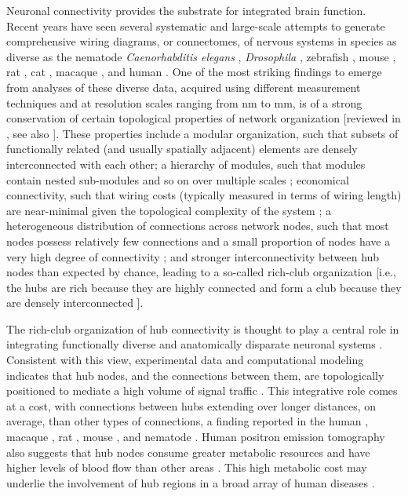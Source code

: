 Neuronal connectivity provides the substrate for integrated brain function.
Recent years have seen several systematic and large-scale attempts to generate comprehensive wiring diagrams, or connectomes, of nervous systems \citep{VandenHeuvel2016} in species as diverse as the nematode \emph{Caenorhabditis elegans} \citep{White1986, Varshney2011}, \emph{Drosophila} \citep{Chiang2011a, Shih2015}, zebrafish \citep{Wanner2016, Hildebrand2017}, mouse \citep{Oh2014, Zingg2014}, rat \citep{Bota2015}, cat \citep{Scannell1995}, macaque \citep{Markov2014, Stephan2001}, and human \citep{Hagmann2008, VanEssen2013}.
One of the most striking findings to emerge from analyses of these diverse data, acquired using different measurement techniques and at resolution scales ranging from nm to mm, is of a strong conservation of certain topological properties of network organization [reviewed in \citep{Bullmore2009, Bullmore2012, Sporns2011, VandenHeuvel2016b, Schroter2017}, see also \citep{Fornito2016}].
These properties include a modular organization, such that subsets of functionally related (and usually spatially adjacent) elements are densely interconnected with each other;
a hierarchy of modules, such that modules contain nested sub-modules and so on over multiple scales \citep{Meunier2010a, Bassett2010};
economical connectivity, such that wiring costs (typically measured in terms of wiring length) are near-minimal given the topological complexity of the system \citep{Betzel2016, Bassett2010};
a heterogeneous distribution of connections across network nodes, such that most nodes possess relatively few connections and a small proportion of nodes have a very high degree of connectivity \citep{VandenHeuvel2013b, Varshney2011};
and stronger interconnectivity between hub nodes than expected by chance, leading to a so-called rich-club organization [i.e., the hubs are rich because they are highly connected and form a club because they are densely interconnected \citep{VandenHeuvel2011,Zamora-Lopez2010,DeReus2013b,Towlson2013,Shih2015}].

The rich-club organization of hub connectivity is thought to play a central role in integrating functionally diverse and anatomically disparate neuronal systems \citep{Fornito2015,VandenHeuvel2013a,Zamora-Lopez2010, Crossley2014,Crossley2013}. Consistent with this view, experimental data and computational modeling indicates that hub nodes, and the connections between them, are topologically positioned to mediate a high volume of signal traffic \citep{VandenHeuvel2012, Harriger2012, Misic2014, Misic2015a}.
This integrative role comes at a cost, with connections between hubs extending over longer distances, on average, than other types of connections, a finding reported in the human \citep{VandenHeuvel2012}, macaque \citep{Harriger2012}, rat \citep{VandenHeuvel2016b}, mouse \citep{Fulcher2016}, and nematode \citep{Towlson2013}.
Human positron emission tomography also suggests that hub nodes consume greater metabolic resources and have higher levels of blood flow than other areas \citep{Tomasi2013, Collin2014, Liang2013a}.
This high metabolic cost may underlie the involvement of hub regions in a broad array of human diseases \citep{Fornito2015, Bullmore2012, Crossley2014}.

